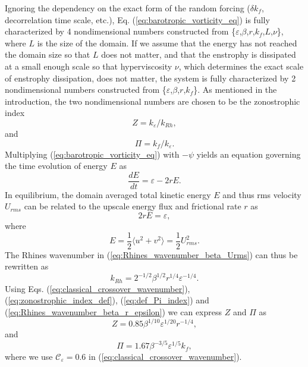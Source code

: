 \documentclass{ametsoc}
\begin{document}
Ignoring the dependency on the exact form of the random forcing 
($\delta k_f$, decorrelation time scale, etc.), Eq. (\ref{eq:barotropic_vorticity_eq})
is fully characterized by 4 nondimensional
numbers constructed from \{$\varepsilon$,$\beta$,$r$,$k_{f}$,$L$,$\nu$\},
where $L$ is the size of the domain. If we assume that the energy has
not reached the domain size so that $L$ does not matter, and that the
enstrophy is dissipated at a small enough scale so that hyperviscosity
$\nu$, which determines the exact scale of enstrophy dissipation,
does not matter, the system is fully characterized
by 2 nondimensional numbers constructed from \{$\varepsilon$,$\beta$,$r$,$k_{f}$\}.
As mentioned in the introduction, the two nondimensional numbers
are chosen to be the zonostrophic index 
\[
Z=k_{\varepsilon}/k_{Rh},
\]
and
\[
\Pi=k_{f}/k_{\varepsilon}.
\]
Multiplying (\ref{eq:barotropic_vorticity_eq}) with $-\psi$ yields
an equation governing the time evolution of energy $E$ as
\begin{equation}
\frac{dE}{dt}=\varepsilon-2rE.\label{eq:energy_evolution_equation}
\end{equation}
In equilibrium, the domain averaged total kinetic energy $E$ and
thus rms velocity $U_{rms}$ can be related to the upscale energy flux
and frictional rate $r$ as
\[
2rE=\varepsilon,
\]
where 
\[
E=\frac{1}{2}\langle u^{2}+v^{2}\rangle=\frac{1}{2}U_{rms}^{2}.
\]
The Rhines wavenumber in (\ref{eq:Rhines_wavenumber_beta_Urms}) can thus
be rewritten as
\begin{equation}
k_{Rh}=2^{-1/2}\beta^{1/2}r^{1/4}\varepsilon^{-1/4}.\label{eq:Rhines_wavenumber_beta_r_epsilon}
\end{equation}
Using Eqs. (\ref{eq:classical_crossover_wavenumber}), (\ref{eq:zonostrophic_index_def}), 
(\ref{eq:def_Pi_index}) and (\ref{eq:Rhines_wavenumber_beta_r_epsilon}) we can express $Z$ and $\Pi$ as
\begin{equation}
Z=0.85\beta^{1/10}\varepsilon^{1/20}r^{-1/4},\label{eq:Z_estimate_in_work}
\end{equation}
and
\begin{equation}
\Pi=1.67\beta^{-3/5}\varepsilon^{1/5}k_{f},\label{eq:PI_estimate_in_work}
\end{equation}
where we use $\mathcal{\mathcal{C}_{\varepsilon}}=0.6$ in (\ref{eq:classical_crossover_wavenumber}).
\end{document}

